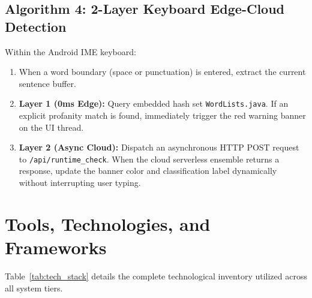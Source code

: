\documentclass[A4paper,12pt]{report}
\theoremstyle{plain}
\theoremstyle{definition}
\theoremstyle{remark}
\numberwithin{equation}{section}
\begin{document}
\subsection{Algorithm 4: 2-Layer Keyboard Edge-Cloud Detection}
Within the Android IME keyboard:
\begin{enumerate}[leftmargin=*]
    \item When a word boundary (space or punctuation) is entered, extract the current sentence buffer.
    \item \textbf{Layer 1 (0ms Edge):} Query embedded hash set \texttt{WordLists.java}. If an explicit profanity match is found, immediately trigger the red warning banner on the UI thread.
    \item \textbf{Layer 2 (Async Cloud):} Dispatch an asynchronous HTTP POST request to \texttt{/api/runtime\_check}. When the cloud serverless ensemble returns a response, update the banner color and classification label dynamically without interrupting user typing.
\end{enumerate}

\section{Tools, Technologies, and Frameworks}
Table~\ref{tab:tech_stack} details the complete technological inventory utilized across all system tiers.
\end{document}
